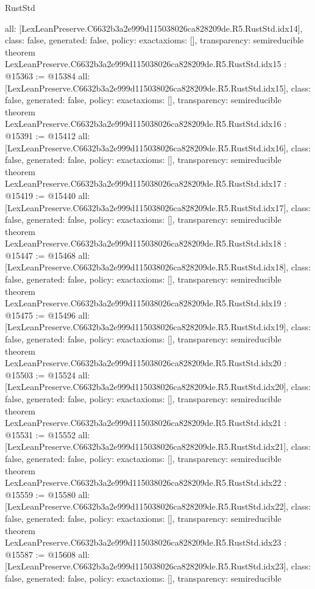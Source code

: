 \begin{lexlean}{RustStd}
\begin{coremodule}
{  all: [LexLeanPreserve.C6632b3a2e999d115038026ca828209de.R5.RustStd.idx14],
  class: false,
  generated: false,
  policy: exact{axioms: []},
  transparency: semireducible
}
theorem LexLeanPreserve.C6632b3a2e999d115038026ca828209de.R5.RustStd.idx15 : @15363 := @15384 {
  all: [LexLeanPreserve.C6632b3a2e999d115038026ca828209de.R5.RustStd.idx15],
  class: false,
  generated: false,
  policy: exact{axioms: []},
  transparency: semireducible
}
theorem LexLeanPreserve.C6632b3a2e999d115038026ca828209de.R5.RustStd.idx16 : @15391 := @15412 {
  all: [LexLeanPreserve.C6632b3a2e999d115038026ca828209de.R5.RustStd.idx16],
  class: false,
  generated: false,
  policy: exact{axioms: []},
  transparency: semireducible
}
theorem LexLeanPreserve.C6632b3a2e999d115038026ca828209de.R5.RustStd.idx17 : @15419 := @15440 {
  all: [LexLeanPreserve.C6632b3a2e999d115038026ca828209de.R5.RustStd.idx17],
  class: false,
  generated: false,
  policy: exact{axioms: []},
  transparency: semireducible
}
theorem LexLeanPreserve.C6632b3a2e999d115038026ca828209de.R5.RustStd.idx18 : @15447 := @15468 {
  all: [LexLeanPreserve.C6632b3a2e999d115038026ca828209de.R5.RustStd.idx18],
  class: false,
  generated: false,
  policy: exact{axioms: []},
  transparency: semireducible
}
theorem LexLeanPreserve.C6632b3a2e999d115038026ca828209de.R5.RustStd.idx19 : @15475 := @15496 {
  all: [LexLeanPreserve.C6632b3a2e999d115038026ca828209de.R5.RustStd.idx19],
  class: false,
  generated: false,
  policy: exact{axioms: []},
  transparency: semireducible
}
theorem LexLeanPreserve.C6632b3a2e999d115038026ca828209de.R5.RustStd.idx20 : @15503 := @15524 {
  all: [LexLeanPreserve.C6632b3a2e999d115038026ca828209de.R5.RustStd.idx20],
  class: false,
  generated: false,
  policy: exact{axioms: []},
  transparency: semireducible
}
theorem LexLeanPreserve.C6632b3a2e999d115038026ca828209de.R5.RustStd.idx21 : @15531 := @15552 {
  all: [LexLeanPreserve.C6632b3a2e999d115038026ca828209de.R5.RustStd.idx21],
  class: false,
  generated: false,
  policy: exact{axioms: []},
  transparency: semireducible
}
theorem LexLeanPreserve.C6632b3a2e999d115038026ca828209de.R5.RustStd.idx22 : @15559 := @15580 {
  all: [LexLeanPreserve.C6632b3a2e999d115038026ca828209de.R5.RustStd.idx22],
  class: false,
  generated: false,
  policy: exact{axioms: []},
  transparency: semireducible
}
theorem LexLeanPreserve.C6632b3a2e999d115038026ca828209de.R5.RustStd.idx23 : @15587 := @15608 {
  all: [LexLeanPreserve.C6632b3a2e999d115038026ca828209de.R5.RustStd.idx23],
  class: false,
  generated: false,
  policy: exact{axioms: []},
  transparency: semireducible
}
\end{coremodule}
\end{lexlean}
